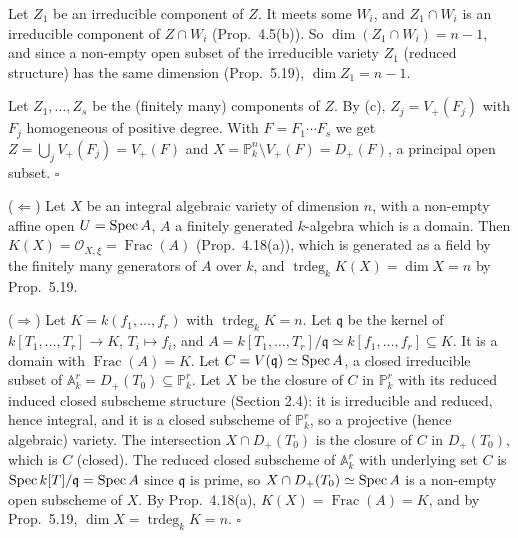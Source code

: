 \documentclass[11pt]{article}
\begin{document}
Let $Z_1$ be an irreducible component of $Z$. It meets some $W_i$, and $Z_1\cap W_i$ is an irreducible component of $Z\cap W_i$ (Prop.~4.5(b)). So $\dim(Z_1\cap W_i)=n-1$, and since a non-empty open subset of the irreducible variety $Z_1$ (reduced structure) has the same dimension (Prop.~5.19), $\dim Z_1=n-1$.

Let $Z_1,\dots,Z_s$ be the (finitely many) components of $Z$. By (c), $Z_j=V_+(F_j)$ with $F_j$ homogeneous of positive degree. With $F=F_1\cdots F_s$ we get $Z=\bigcup_jV_+(F_j)=V_+(F)$ and $X=\mathbb P^n_k\setminus V_+(F)=D_+(F)$, a principal open subset. \hfill$\square$

\pf
($\Leftarrow$) Let $X$ be an integral algebraic variety of dimension $n$, with a non-empty affine open $U=\operatorname{Spec} A$, $A$ a finitely generated $k$-algebra which is a domain. Then $K(X)=\mathcal O_{X,\xi}=\operatorname{Frac}(A)$ (Prop.~4.18(a)), which is generated as a field by the finitely many generators of $A$ over $k$, and $\operatorname{trdeg}_kK(X)=\dim X=n$ by Prop.~5.19.

($\Rightarrow$) Let $K=k(f_1,\dots,f_r)$ with $\operatorname{trdeg}_kK=n$. Let $\mathfrak q$ be the kernel of $k[T_1,\dots,T_r]\to K$, $T_i\mapsto f_i$, and $A=k[T_1,\dots,T_r]/\mathfrak q\simeq k[f_1,\dots,f_r]\subseteq K$. It is a domain with $\operatorname{Frac}(A)=K$. Let $C=V(\mathfrak q)\simeq\operatorname{Spec} A$, a closed irreducible subset of $\mathbb A^r_k=D_+(T_0)\subseteq\mathbb P^r_k$. Let $X$ be the closure of $C$ in $\mathbb P^r_k$ with its reduced induced closed subscheme structure (Section 2.4): it is irreducible and reduced, hence integral, and it is a closed subscheme of $\mathbb P^r_k$, so a projective (hence algebraic) variety. The intersection $X\cap D_+(T_0)$ is the closure of $C$ in $D_+(T_0)$, which is $C$ (closed). The reduced closed subscheme of $\mathbb A^r_k$ with underlying set $C$ is $\operatorname{Spec} k[T]/\mathfrak q=\operatorname{Spec} A$ since $\mathfrak q$ is prime, so $X\cap D_+(T_0)\simeq\operatorname{Spec} A$ is a non-empty open subscheme of $X$. By Prop.~4.18(a), $K(X)=\operatorname{Frac}(A)=K$, and by Prop.~5.19, $\dim X=\operatorname{trdeg}_kK=n$. \hfill$\square$
\end{document}
